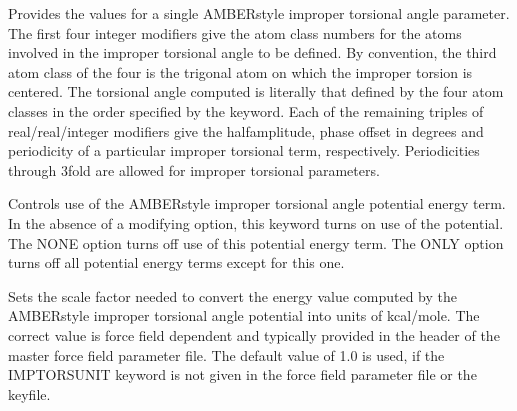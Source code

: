 \documentclass[letterpaper,11pt,english]{sphinxmanual}
\begin{document}
\ignorespaces {}\label{\detokenize{text/keywords:key-imptors}}\begin{description}
\sphinxAtStartPar
Provides the values for a single AMBER\sphinxhyphen{}style improper torsional angle parameter. The first four integer modifiers give the atom class numbers for the atoms involved in the improper torsional angle to be defined. By convention, the third atom class of the four is the trigonal atom on which the improper torsion is centered. The torsional angle computed is literally that defined by the four atom classes in the order specified by the keyword. Each of the remaining triples of real/real/integer modifiers give the half\sphinxhyphen{}amplitude, phase offset in degrees and periodicity of a particular improper torsional term, respectively. Periodicities through 3\sphinxhyphen{}fold are allowed for improper torsional parameters.

\end{description}

\ignorespaces {}\label{\detokenize{text/keywords:key-imptorsterm}}\begin{description}
\sphinxAtStartPar
Controls use of the AMBER\sphinxhyphen{}style improper torsional angle potential energy term. In the absence of a modifying option, this keyword turns on use of the potential. The NONE option turns off use of this potential energy term. The ONLY option turns off all potential energy terms except for this one.

\end{description}

\ignorespaces {}\label{\detokenize{text/keywords:key-imptorsunit}}\begin{description}
\sphinxAtStartPar
Sets the scale factor needed to convert the energy value computed by the AMBER\sphinxhyphen{}style improper torsional angle potential into units of kcal/mole. The correct value is force field dependent and typically provided in the header of the master force field parameter file. The default value of 1.0 is used, if the IMPTORSUNIT keyword is not given in the force field parameter file or the keyfile.

\end{description}
\end{document}
